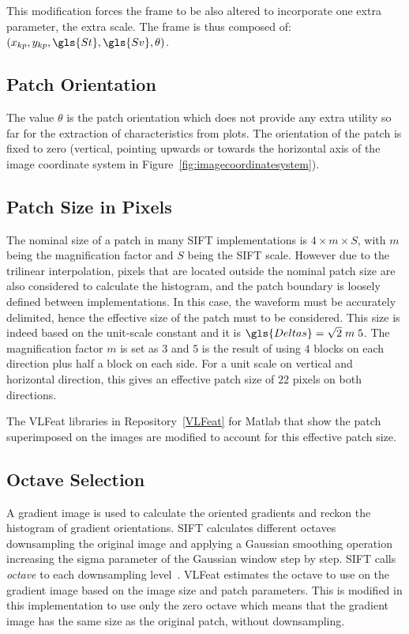This modification forces the frame to be also altered to incorporate one extra parameter, the extra scale.  The frame is thus composed of: $ ( x_{kp}, y_{kp}, \gls{St}, \gls{Sv}, \theta ) $.  

\subsection{Patch Orientation}

The value $\theta$ is the patch orientation which does not provide any extra utility so far for the extraction of characteristics from plots.  The orientation of the patch is fixed to zero (vertical, pointing upwards or towards the horizontal axis of the image coordinate system in Figure~\ref{fig:imagecoordinatesystem}).

\subsection{Patch Size in Pixels}

The nominal size of a patch in many SIFT implementations is $4 \times m \times S$, with $m$ being the magnification factor and $S$ being the SIFT scale.  However due to the trilinear interpolation, pixels that are located outside the nominal patch size are also considered to calculate the histogram, and the patch boundary is loosely defined between implementations.  In this case, the waveform must be accurately delimited, hence the effective size of the patch must to be considered. This size is indeed based on the unit-scale constant and it is $\gls{Deltas} = \sqrt{2} \; m \; 5$.  The magnification factor $m$ is set as $3$ and $5$ is the result of using $4$ blocks on each direction plus half a block on each side.  For a unit scale on vertical and horizontal direction, this gives an effective patch size of $22$ pixels on both directions.

The VLFeat libraries in Repository~\ref{VLFeat} for Matlab that show the patch superimposed on the images are modified to account for this effective patch size.

\subsection{Octave Selection}

A gradient image is used to calculate the oriented gradients and reckon the histogram of gradient orientations.   SIFT calculates different octaves downsampling the original image and applying a Gaussian smoothing operation increasing the sigma parameter of the Gaussian window step by step.  SIFT calls \textit{octave} to each downsampling level~\cite{Lowe2004,Rey-Otero2014}. VLFeat estimates the octave to use on the gradient image based on the image size and patch parameters.   This is modified in this implementation to use only the zero octave which means that the gradient image has the same size as the original patch, without downsampling.

